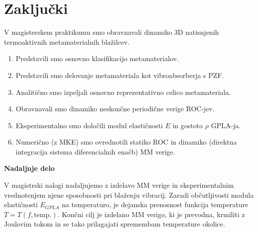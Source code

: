 \newpage
\chapter{Zaključki}\label{cha:zakljucki}

    V magisterskem praktikumu smo obravnavali dinamiko 3D natisnjenih termoaktivnih metamaterialnih blažilcev. 

    \begin{enumerate}
        \item Predstavili smo osnovno klasifikacijo metamaterialov.
        \item Predstavili smo delovanje metamateriala kot vibroabsorberja s PZF.
        \item Analitično smo izpeljali osnovno reprezentativno celico metamateriala.
        \item Obravnavali smo dinamiko neskončne periodične verige ROC-jev.
        \item Eksperimentalno smo določili modul elastičnosti $E$ in gostoto $\rho$ GPLA-ja.
        \item Numerično (z MKE) smo ovrednotili statiko ROC in dinamiko (direktna integracija sistema diferencialnih enačb) MM verige.  
    \end{enumerate}

\textbf{Nadaljnje delo}

    V magistrski nalogi nadaljujemo z izdelavo MM verige in eksperimentalnim vrednotenjem njene sposobnosti pri blaženju vibracij. Zaradi občutljivosti modula elastičnosti $E_{GPLA}$ na temperaturo, je dejanska prenosnost funkcija temperature $T=T(f, \text{temp.})$.
    Končni cilj je izdelano MM verigo, ki je prevodna, krmiliti z Joulovim tokom in se tako prilagajati spremembam temperature okolice. 
    
